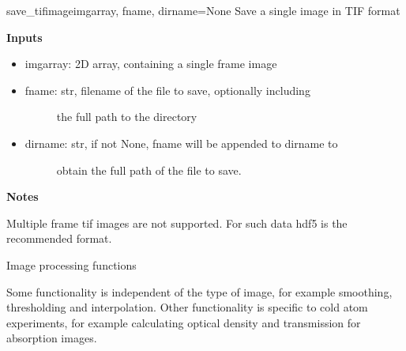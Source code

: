 \documentclass[letterpaper,10pt,english]{manual}
\begin{document}
\hypertarget{imageio.save_tifimage}{}\begin{funcdesc}{save\_tifimage}{imgarray, fname, dirname=None}
Save a single image in TIF format

\textbf{Inputs}
\begin{itemize}
\item {} 
imgarray: 2D array, containing a single frame image

\item {} \begin{description}
\item[fname: str, filename of the file to save, optionally including]
the full path to the directory

\end{description}

\item {} \begin{description}
\item[dirname: str, if not None, fname will be appended to dirname to]
obtain the full path of the file to save.

\end{description}

\end{itemize}

\textbf{Notes}

Multiple frame tif images are not supported. For such data hdf5 is the
recommended format.
\end{funcdesc}
\modulesynopsis{}
Image processing functions

Some functionality is independent of the type of image, for example
smoothing, thresholding and interpolation. Other functionality is specific
to cold atom experiments, for example calculating optical density and
transmission for absorption images.
\end{document}
